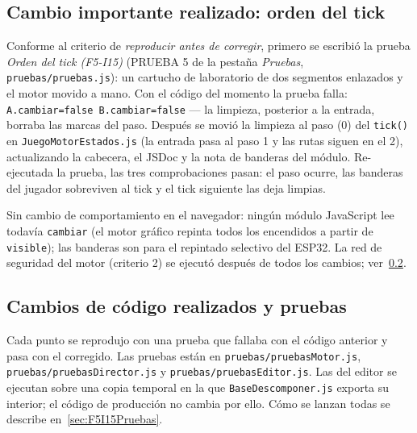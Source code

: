 \subsection{Cambio importante realizado: orden del tick}
\label{sec:F5I15OrdenTick}

Conforme al criterio de \emph{reproducir antes de corregir}, primero se escribió la prueba \emph{Orden del tick (F5-I15)} (PRUEBA 5 de la pestaña \emph{Pruebas}, \texttt{pruebas/pruebas.js}): un cartucho de laboratorio de dos segmentos enlazados y el motor movido a mano. Con el código del momento la prueba falla: \texttt{A.cambiar=false B.cambiar=false} — la limpieza, posterior a la entrada, borraba las marcas del paso. Después se movió la limpieza al paso (0) del \texttt{tick()} en \texttt{JuegoMotorEstados.js} (la entrada pasa al paso 1 y las rutas siguen en el 2), actualizando la cabecera, el JSDoc y la nota de banderas del módulo. Re-ejecutada la prueba, las tres comprobaciones pasan: el paso ocurre, las banderas del jugador sobreviven al tick y el tick siguiente las deja limpias.

Sin cambio de comportamiento en el navegador: ningún módulo JavaScript lee todavía \texttt{cambiar} (el motor gráfico repinta todos los encendidos a partir de \texttt{visible}); las banderas son para el repintado selectivo del ESP32. La red de seguridad del motor (criterio 2) se ejecutó después de todos los cambios; ver~\ref{sec:F5I15Cambios}.

\subsection{Cambios de código realizados y pruebas}
\label{sec:F5I15Cambios}

Cada punto se reprodujo con una prueba que fallaba con el código anterior y pasa con el corregido. Las pruebas están en \texttt{pruebas/pruebasMotor.js}, \texttt{pruebas/pruebasDirector.js} y \texttt{pruebas/pruebasEditor.js}. Las del editor se ejecutan sobre una copia temporal en la que \texttt{BaseDescomponer.js} exporta su interior; el código de producción no cambia por ello. Cómo se lanzan todas se describe en~\ref{sec:F5I15Pruebas}.

